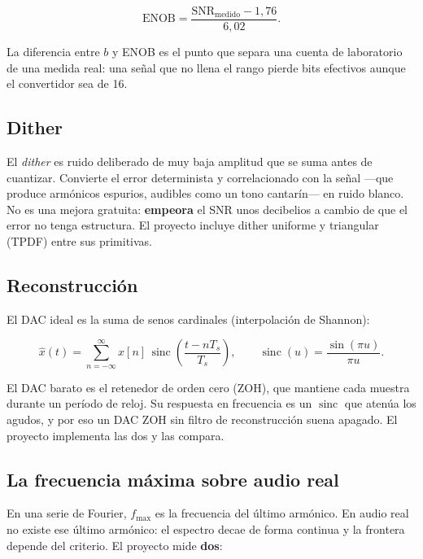 \documentclass[11pt,a4paper]{article}
\newcommand{\fmax}{f_{\max}}
\begin{document}
\begin{equation}
\mathrm{ENOB} = \frac{\mathrm{SNR}_{\text{medido}} - 1{,}76}{6{,}02} .
\label{eq:enob}
\end{equation}

La diferencia entre \(b\) y ENOB es el punto que separa una cuenta de
laboratorio de una medida real: una señal que no llena el rango pierde bits
efectivos aunque el convertidor sea de 16.

\subsection{Dither}

El \emph{dither} es ruido deliberado de muy baja amplitud que se suma antes de
cuantizar. Convierte el error determinista y correlacionado con la señal
---que produce armónicos espurios, audibles como un tono cantarín--- en ruido
blanco. No es una mejora gratuita: \textbf{empeora} el SNR unos decibelios a
cambio de que el error no tenga estructura. El proyecto incluye dither
uniforme y triangular (TPDF) entre sus primitivas.

\subsection{Reconstrucción}

El DAC ideal es la suma de senos cardinales (interpolación de Shannon):

\begin{equation}
\hat{x}(t) = \sum_{n=-\infty}^{\infty} x[n]\,
\operatorname{sinc}\!\left(\frac{t - nT_s}{T_s}\right),
\qquad
\operatorname{sinc}(u) = \frac{\sin(\pi u)}{\pi u}.
\label{eq:sinc}
\end{equation}

El DAC barato es el retenedor de orden cero (ZOH), que mantiene cada muestra
durante un período de reloj. Su respuesta en frecuencia es un
\(\operatorname{sinc}\) que atenúa los agudos, y por eso un DAC ZOH sin
filtro de reconstrucción suena apagado. El proyecto implementa las dos y las
compara.

\subsection{La frecuencia máxima sobre audio real}

En una serie de Fourier, \(\fmax\) es la frecuencia del último armónico. En
audio real no existe ese último armónico: el espectro decae de forma continua
y la frontera depende del criterio. El proyecto mide \textbf{dos}:
\end{document}
